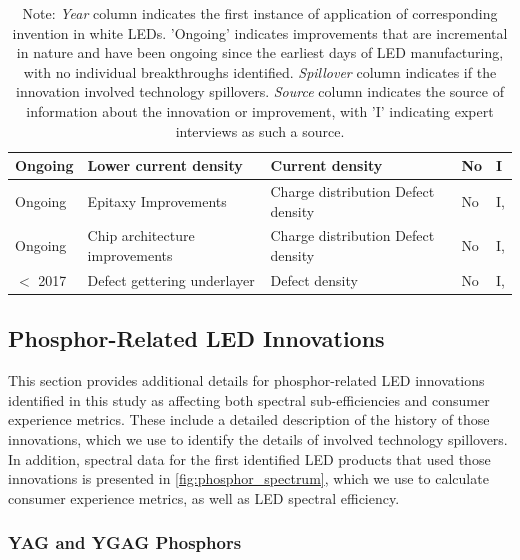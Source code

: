 \documentclass[parskip=full]{article}
\begin{document}
\begin{table}[H]
\begin{NiceTabularX}{\textwidth}{ |l|X|X|l|l| }
            Ongoing & Lower current density & Current density & No & I \\
        \hline
            Ongoing & Epitaxy \newline Improvements & Charge distribution \newline Defect density & No & I, \cite{bhardwaj2016progress} \\
        \hline
            Ongoing & Chip architecture \newline improvements  & Charge distribution \newline Defect density & No & I, \cite{Wildeson2017} \\
        \hline
            $<$ 2017 & Defect gettering \newline underlayer & Defect density & No & I, \cite{haller2017burying} \\
        \hline
        \end{NiceTabularX}
    \caption*{Note: \textit{Year} column indicates the first instance of application of corresponding invention in white LEDs. 'Ongoing' indicates improvements that are incremental in nature and have been ongoing since the earliest days of LED manufacturing, with no individual breakthroughs identified. \textit{Spillover} column indicates if the innovation involved technology spillovers. \textit{Source} column indicates the source of information about the innovation or improvement, with 'I' indicating expert interviews as such a source.}
    \label{tab:innovations}
\end{table}

\subsection{Phosphor-Related LED Innovations}
\label{sec:innovation_phosphor}

This section provides additional details for phosphor-related LED innovations identified in this study as affecting both spectral sub-efficiencies and consumer experience metrics. These include a detailed description of the history of those innovations, which we use to identify the details of involved technology spillovers. In addition, spectral data for the first identified LED products that used those innovations is presented in \cref{fig:phosphor_spectrum}, which we use to calculate consumer experience metrics, as well as LED spectral efficiency.

\subsubsection{YAG and YGAG Phosphors}
\end{document}
